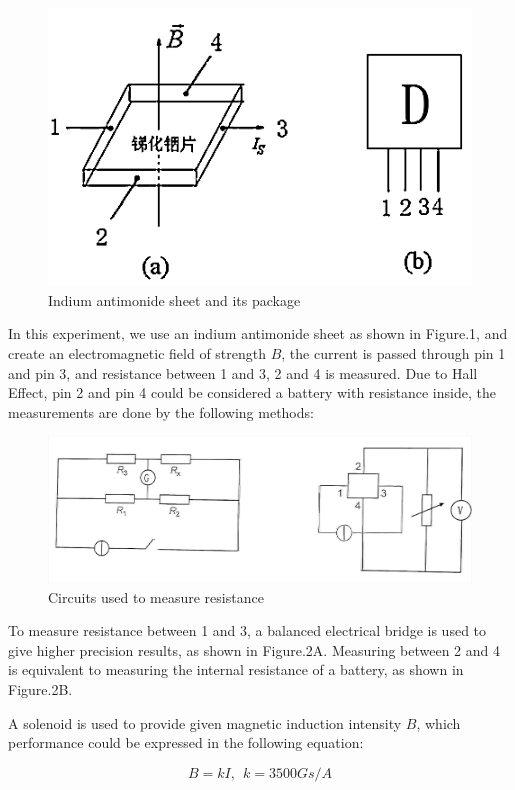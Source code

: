 \documentclass[a4paper]{article}
\begin{document}
\begin{multicols*}{2}
  \begin{figure}[H]
    \centering
    \includegraphics[width=0.8\linewidth]{./img/Fig.1.png}
    \caption{Indium antimonide sheet and its package}
    \label{fig:figure1}
  \end{figure}

  In this experiment, we use an indium antimonide sheet as shown in Figure.1, and create an electromagnetic field of strength $B$, the current is passed through pin 1 and pin 3, and resistance between 1 and 3, 2 and 4 is measured. Due to Hall Effect, pin 2 and pin 4 could be considered a battery with resistance inside, the measurements are done by the following methods:

  \begin{figure}[H]
    \centering
    \includegraphics[width=0.8\linewidth]{./img/Fig.2.jpg}
    \caption{Circuits used to measure resistance}
    \label{fig:figure2}
  \end{figure}

  To measure resistance between 1 and 3, a balanced electrical bridge is used to give higher precision results, as shown in Figure.2A. Measuring between 2 and 4 is equivalent to measuring the internal resistance of a battery, as shown in Figure.2B.

  A solenoid is used to provide given magnetic induction intensity $B$, which performance could be expressed in the following equation:

  \begin{equation}
    B = k I,\ \ k = 3500Gs/A
  \end{equation}


\end{multicols*}
\end{document}
